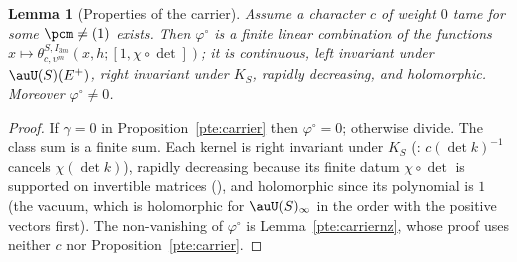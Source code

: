 \documentclass[10pt]{amsart}
\newtheorem{lemma}[theorem]{Lemma}
\theoremstyle{definition}
\theoremstyle{remark}
\begin{document}
\begin{lemma}[Properties of the carrier]\label{pte:carrierprop}
Assume a character $c$ of weight $0$ tame for some $\pcm\ne(1)$ exists. Then $\varphi^\circ$ is a finite
linear combination of the functions $x\mapsto\theta^{S,I_{3m}}_{c,\upsilon^m}(x,h;[1,\chi\circ\det])$; it is
continuous, left invariant under $\auU(S)(E^+)$, right invariant under $K_S$, rapidly decreasing, and
holomorphic. Moreover $\varphi^\circ\ne0$.
\end{lemma}
\begin{proof}
If $\gamma=0$ in Proposition~\ref{pte:carrier} then $\varphi^\circ=0$; otherwise divide. The class sum is a
finite sum. Each kernel is right invariant under $K_S$ ({\cite[Lemma~2.9]{P53}}: $c(\det k)^{-1}$ cancels
$\chi(\det k)$), rapidly decreasing because its finite datum $\chi\circ\det$ is supported on invertible
matrices ({\cite[Proposition~3.26]{P53}}), and holomorphic since its polynomial is $1$ (the vacuum, which is
holomorphic for $\auU(S)_\infty$ in the order with the positive vectors first). The non-vanishing
of $\varphi^\circ$ is Lemma~\ref{pte:carriernz}, whose proof uses neither $c$ nor
Proposition~\ref{pte:carrier}.
\end{proof}
\end{document}
